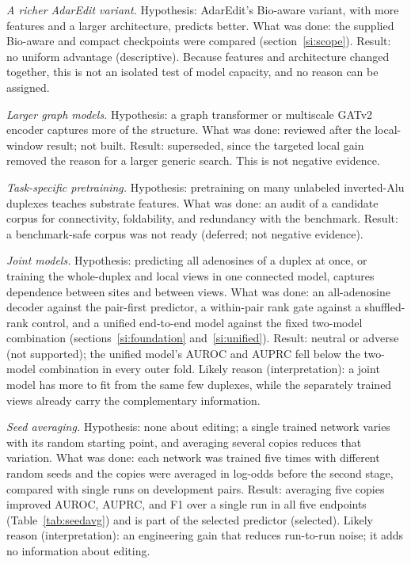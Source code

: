 \documentclass[9pt,twoside]{pnas-new}
\begin{document}
\textit{A richer AdarEdit variant.} Hypothesis: AdarEdit's Bio-aware variant, with more features and a larger architecture, predicts better. What was done: the supplied Bio-aware and compact checkpoints were compared (section~\ref{si:scope}). Result: no uniform advantage (descriptive). Because features and architecture changed together, this is not an isolated test of model capacity, and no reason can be assigned.

\textit{Larger graph models.} Hypothesis: a graph transformer or multiscale GATv2 encoder captures more of the structure. What was done: reviewed after the local-window result; not built. Result: superseded, since the targeted local gain removed the reason for a larger generic search. This is not negative evidence.

\textit{Task-specific pretraining.} Hypothesis: pretraining on many unlabeled inverted-Alu duplexes teaches substrate features. What was done: an audit of a candidate corpus for connectivity, foldability, and redundancy with the benchmark. Result: a benchmark-safe corpus was not ready (deferred; not negative evidence).

\textit{Joint models.} Hypothesis: predicting all adenosines of a duplex at once, or training the whole-duplex and local views in one connected model, captures dependence between sites and between views. What was done: an all-adenosine decoder against the pair-first predictor, a within-pair rank gate against a shuffled-rank control, and a unified end-to-end model against the fixed two-model combination (sections~\ref{si:foundation} and~\ref{si:unified}). Result: neutral or adverse (not supported); the unified model's AUROC and AUPRC fell below the two-model combination in every outer fold. Likely reason (interpretation): a joint model has more to fit from the same few duplexes, while the separately trained views already carry the complementary information.

\textit{Seed averaging.} Hypothesis: none about editing; a single trained network varies with its random starting point, and averaging several copies reduces that variation. What was done: each network was trained five times with different random seeds and the copies were averaged in log-odds before the second stage, compared with single runs on development pairs. Result: averaging five copies improved AUROC, AUPRC, and F1 over a single run in all five endpoints (Table~\ref{tab:seedavg}) and is part of the selected predictor (selected). Likely reason (interpretation): an engineering gain that reduces run-to-run noise; it adds no information about editing.

\FloatBarrier

\end{document}
